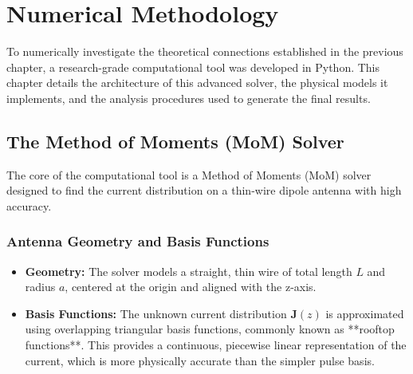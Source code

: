 \documentclass[11pt, a4paper]{report}
\begin{document}
\chapter{Numerical Methodology}

To numerically investigate the theoretical connections established in the previous chapter, a research-grade computational tool was developed in Python. This chapter details the architecture of this advanced solver, the physical models it implements, and the analysis procedures used to generate the final results.

\section{The Method of Moments (MoM) Solver}
The core of the computational tool is a Method of Moments (MoM) solver designed to find the current distribution on a thin-wire dipole antenna with high accuracy.

\subsection{Antenna Geometry and Basis Functions}
\begin{itemize}
    \item \textbf{Geometry:} The solver models a straight, thin wire of total length $L$ and radius $a$, centered at the origin and aligned with the z-axis.
    \item \textbf{Basis Functions:} The unknown current distribution $\mathbf{J}(z)$ is approximated using overlapping triangular basis functions, commonly known as **rooftop functions**. This provides a continuous, piecewise linear representation of the current, which is more physically accurate than the simpler pulse basis.
\end{itemize}
\end{document}
